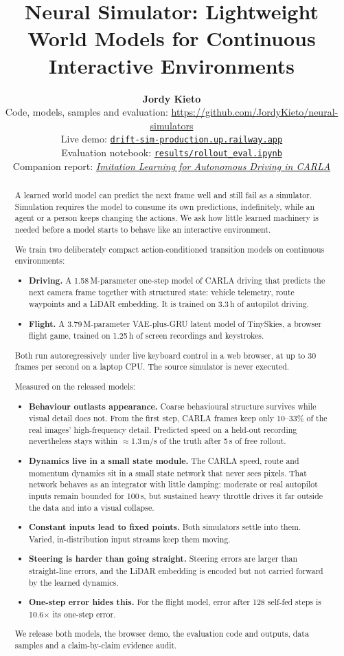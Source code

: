 \documentclass[11pt]{article}
\title{\LARGE\bfseries Neural Simulator: Lightweight World Models for Continuous Interactive Environments}
\author{%
  \textbf{Jordy Kieto}\\[4pt]
  \small Code, models, samples and evaluation: \url{https://github.com/JordyKieto/neural-simulators}\\
  \small Live demo: \href{https://drift-sim-production.up.railway.app/}{\texttt{drift-sim-production.up.railway.app}}\\
  \small Evaluation notebook: \href{https://github.com/JordyKieto/neural-simulators/blob/main/results/rollout_eval.ipynb}{\texttt{results/rollout\_eval.ipynb}}\\
  \small Companion report: \href{https://github.com/JordyKieto/carla-imitation-learning}{\textit{Imitation Learning for Autonomous Driving in CARLA}}
}
\date{}
\begin{document}
\maketitle
\thispagestyle{firstpage}

\begin{abstract}
\noindent A learned world model can predict the next frame well and still fail as a simulator. Simulation requires the model to consume its own predictions, indefinitely, while an agent or a person keeps changing the actions. We ask how little learned machinery is needed before a model starts to behave like an interactive environment.

\smallskip
\noindent We train two deliberately compact action-conditioned transition models on continuous environments:
\begin{itemize}
  \item \textbf{Driving.} A 1.58\,M-parameter one-step model of CARLA driving that predicts the next camera frame together with structured state: vehicle telemetry, route waypoints and a LiDAR embedding. It is trained on 3.3\,h of autopilot driving.
  \item \textbf{Flight.} A 3.79\,M-parameter VAE-plus-GRU latent model of TinySkies, a browser flight game, trained on 1.25\,h of screen recordings and keystrokes.
\end{itemize}
Both run autoregressively under live keyboard control in a web browser, at up to 30 frames per second on a laptop CPU. The source simulator is never executed.

\smallskip
\noindent Measured on the released models:
\begin{itemize}
  \item \textbf{Behaviour outlasts appearance.} Coarse behavioural structure survives while visual detail does not. From the first step, CARLA frames keep only 10--33\% of the real images' high-frequency detail. Predicted speed on a held-out recording nevertheless stays within $\approx$1.3\,m/s of the truth after 5\,s of free rollout.
  \item \textbf{Dynamics live in a small state module.} The CARLA speed, route and momentum dynamics sit in a small state network that never sees pixels. That network behaves as an integrator with little damping: moderate or real autopilot inputs remain bounded for 100\,s, but sustained heavy throttle drives it far outside the data and into a visual collapse.
  \item \textbf{Constant inputs lead to fixed points.} Both simulators settle into them. Varied, in-distribution input streams keep them moving.
  \item \textbf{Steering is harder than going straight.} Steering errors are larger than straight-line errors, and the LiDAR embedding is encoded but not carried forward by the learned dynamics.
  \item \textbf{One-step error hides this.} For the flight model, error after 128 self-fed steps is 10.6$\times$ its one-step error.
\end{itemize}
We release both models, the browser demo, the evaluation code and outputs, data samples and a claim-by-claim evidence audit.
\end{abstract}
\end{document}
